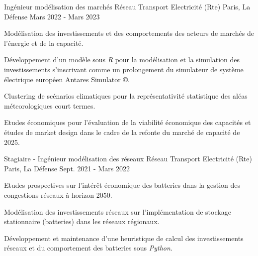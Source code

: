

\begin{cventries}

  \cventry
    {Ingénieur modélisation des marchés} %
    {Réseau Transport Electricité (Rte)} %
    {Paris, La Défense} %
    {Mars 2022 - Mars 2023} %
    {
      \begin{cvitems} %
        \item {Modélisation des investissements et des comportements des acteurs de marchés de l'énergie et de la capacité.}
        \item {Développement d'un modèle sous \textit{R} pour la modélisation et la simulation des investissements s'inscrivant comme un prolongement du simulateur de système électrique européen Antares Simulator \copyright.}
        \item {Clustering de scénarios climatiques pour la représentativité statistique des aléas méteorologiques court termes.}
        \item {Etudes économiques pour l'évaluation de la viabilité économique des capacités et études de market design dans le cadre de la refonte du marché de capacité de 2025.}
      \end{cvitems}
    }

  \cventry
    {Stagiaire - Ingénieur modélisation des réseaux} %
    {Réseau Transport Electricité (Rte)} %
    {Paris, La Défense} %
    {Sept. 2021 - Mars 2022} %
    {
      \begin{cvitems} %
        \item {Etudes prospectives sur l'intérêt économique des batteries dans la gestion des congestions réseaux à horizon 2050.}
        \item {Modélisation des investissements réseaux sur l'implémentation de stockage stationnaire (batteries) dans les réseaux régionaux.}
        \item {Développement et maintenance d'une heuristique de calcul des investissements réseaux et du comportement des batteries sous \textit{Python}.} 
      \end{cvitems}
    }


\end{cventries}

